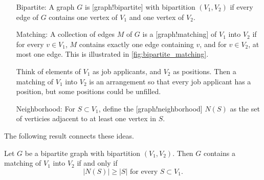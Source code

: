 \begin{itemize}[]
	\item[Bipartite:]  
A graph $G$ is [graph!bipartite] with bipartition $(V_1,V_2)$ if every edge of $G$ contains one vertex of $V_1$ and one vertex of $V_2$. 

\item[Matching: ]A collection of edges $M$ of $G$ is a [graph!matching] of $V_1$ into $V_2$ if for every $v\in V_1$, $M$ contains exactly one edge containing $v$, and for $v\in V_2$, at most one edge. This is illustrated in \cref{fig:bipartite_matching}.

\begin{marginfigure}
\begin{center}
\end{center}
\caption{Think of elements of $V_1$ as job applicants, and $V_2$ as positions. Then a matching of $V_1$ into $V_2$ is an arrangement so that every job applicant has a position, but some positions could be unfilled.  \label{fig:bipartite_matching}}
\end{marginfigure}


\item[Neighborhood:] For $S\subset V_1$, define the [graph!neighborhood] $N(S)$ as the set of verticies adjacent to at least one vertex in $S$.
\end{itemize}
The following result connects these ideas.
\begin{theorem}
Let $G$ be a bipartite graph with bipartition $(V_1,V_2)$. Then $G$ contains a matching of $V_1$ into $V_2$ if and only if 
\begin{equation}	 \label{eq:Hall_condition}
|N(S)| \geq |S| \text{ for every } S\subset V_1. \tag{Hall's condition}
\end{equation}
\end{theorem}
